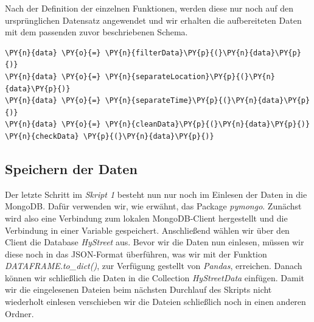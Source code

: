 Nach der Definition der einzelnen Funktionen, werden diese nur noch auf den ursprünglichen Datensatz angewendet und wir erhalten die aufbereiteten Daten mit dem passenden zuvor beschriebenen Schema.

\bigbreak
\begin{tcolorbox}[breakable, size=fbox, boxrule=1pt, pad at break*=1mm,colback=cellbackground, colframe=cellborder]
\begin{Verbatim}[commandchars=\\\{\}]
\PY{n}{data} \PY{o}{=} \PY{n}{filterData}\PY{p}{(}\PY{n}{data}\PY{p}{)}
\PY{n}{data} \PY{o}{=} \PY{n}{separateLocation}\PY{p}{(}\PY{n}{data}\PY{p}{)}
\PY{n}{data} \PY{o}{=} \PY{n}{separateTime}\PY{p}{(}\PY{n}{data}\PY{p}{)}
\PY{n}{data} \PY{o}{=} \PY{n}{cleanData}\PY{p}{(}\PY{n}{data}\PY{p}{)}
\PY{n}{checkData} \PY{p}{(}\PY{n}{data}\PY{p}{)}
\end{Verbatim}
\end{tcolorbox}
\bigbreak

\subsection{Speichern der Daten}
Der letzte Schritt im \emph{Skript 1} besteht nun nur noch im Einlesen der Daten in die MongoDB. Dafür verwenden wir, wie erwähnt, das Package \emph{pymongo}. Zunächst wird also eine Verbindung zum lokalen MongoDB-Client hergestellt und die Verbindung in einer Variable gespeichert. Anschließend wählen wir über den Client die Database \emph{HyStreet} aus. Bevor wir die Daten nun einlesen, müssen wir diese noch in das JSON-Format überführen, was wir mit der Funktion \emph{DATAFRAME.to\_dict()}, zur Verfügung gestellt von \emph{Pandas}, erreichen. Danach können wir schließlich die Daten in die Collection \emph{HyStreetData} einfügen. 
Damit wir die eingelesenen Dateien beim nächsten Durchlauf des Skripts nicht wiederholt einlesen verschieben wir die Dateien schließlich noch in einen anderen Ordner.

